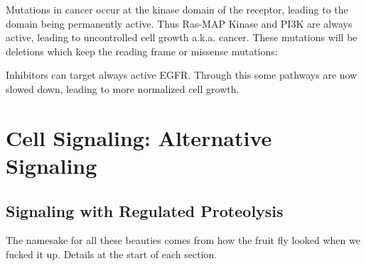 \documentclass[../main.tex]{subfiles}
\begin{document}
\begin{figure}[H]
	\centering
	\caption{}
\end{figure}

Mutations in cancer occur at the kinase domain of the receptor, leading to the domain being permanently active. Thus Ras-MAP Kinase and PI3K are always active, leading to uncontrolled cell growth a.k.a. cancer. These mutations will be deletions which keep the reading frame or missense mutations:
\begin{figure}[H]
	\centering
	
	\caption{}
\end{figure}

Inhibitors can target always active EGFR. Through this some pathways are now slowed down, leading to more normalized cell growth.


\section{Cell Signaling: Alternative Signaling}
\subsection{Signaling with Regulated Proteolysis}
The namesake for all these beauties comes from how the fruit fly looked when we fucked it up. Details at the start of each section.
\end{document}
